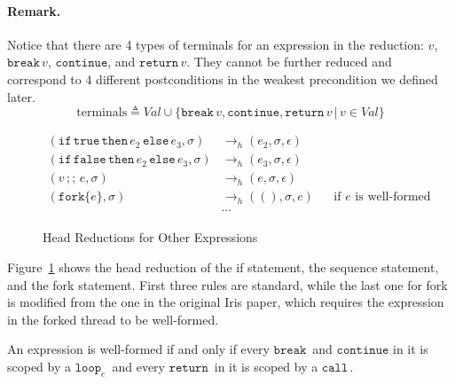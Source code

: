 \documentclass{article}
\numberwithin{algorithm}{section}
\newcommand{\true}{\texttt{true}}
\newcommand{\false}{\texttt{false}}
\newcommand{\cfork}[1]{\texttt{fork}\{#1\}}
\newcommand{\cloop}[1]{\texttt{loop}_{#1}\,}
\newcommand{\cbreak}{\texttt{break}\,}
\newcommand{\ccontinue}{\texttt{continue}}
\newcommand{\cif}{\texttt{if}\,}
\newcommand{\cthen}{\,\texttt{then}\,}
\newcommand{\celse}{\,\texttt{else}\,}
\newcommand{\cseq}{\,;;\,}
\newcommand{\creturn}{\texttt{return}\,}
\newcommand{\ccall}{\texttt{call}\,}
\newcommand{\hred}{\rightarrow_h}
\newcommand{\sep}{\,|\,}
\begin{document}
\paragraph{Remark.} Notice that there are 4 types of terminals for an expression in the reduction: $v$, $\cbreak v$, $\ccontinue$, and $\creturn v$.
They cannot be further reduced and correspond to 4 different postconditions in the weakest precondition we defined later.
$$
\text{terminals} \triangleq \textit{Val} \cup \{\cbreak v, \ccontinue, \creturn v \sep v \in \textit{Val}\}
$$

\begin{figure}[h]
$$
\begin{aligned}
    (\cif \true \cthen e_2 \celse e_3, \sigma) &\hred (e_2, \sigma, \epsilon) && \\
    (\cif \false \cthen e_2 \celse e_3, \sigma) &\hred (e_3, \sigma, \epsilon) && \\
    (v \cseq e, \sigma) &\hred (e, \sigma, \epsilon) && \\
    (\cfork{e}, \sigma) &\hred ((), \sigma, e) && \text{if $e$ is well-formed} \\
    &\cdots
\end{aligned}
$$
\caption{Head Reductions for Other Expressions}
\label{fig:hred-other}
\end{figure}

Figure~\ref{fig:hred-other} shows the head reduction of the if statement, the sequence statement, and the fork statement.
First three rules are standard, while the last one for fork is modified from the one in the original Iris paper, which requires the expression in the forked thread to be well-formed.
\begin{definition}
    An expression is well-formed if and only if every $\cbreak\!$ and $\ccontinue$ in it is scoped by a $\cloop{e}\!$ and every $\creturn\!$ in it is scoped by a $\ccall\!$.    
\end{definition}
\end{document}
